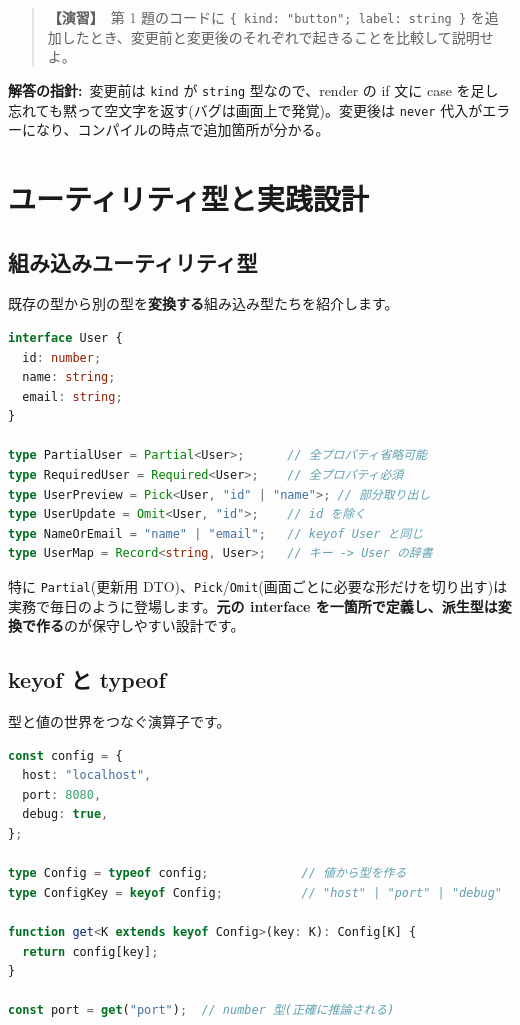 \documentclass{article}
\begin{document}
\begin{quote}
\textbf{【演習】}\ 第 1 題のコードに \texttt{\{ kind: "button"; label: string \}} を追加したとき、変更前と変更後のそれぞれで起きることを比較して説明せよ。
\end{quote}

\textbf{解答の指針:}\ 変更前は \texttt{kind} が \texttt{string} 型なので、render の if 文に case を足し忘れても黙って空文字を返す(バグは画面上で発覚)。変更後は \texttt{never} 代入がエラーになり、コンパイルの時点で追加箇所が分かる。

\section{ユーティリティ型と実践設計}

\subsection{組み込みユーティリティ型}

既存の型から別の型を\textbf{変換する}組み込み型たちを紹介します。

\begin{lstlisting}[language=TypeScript]
interface User {
  id: number;
  name: string;
  email: string;
}

type PartialUser = Partial<User>;      // 全プロパティ省略可能
type RequiredUser = Required<User>;    // 全プロパティ必須
type UserPreview = Pick<User, "id" | "name">; // 部分取り出し
type UserUpdate = Omit<User, "id">;    // id を除く
type NameOrEmail = "name" | "email";   // keyof User と同じ
type UserMap = Record<string, User>;   // キー -> User の辞書
\end{lstlisting}

特に \texttt{Partial}(更新用 DTO)、\texttt{Pick}/\texttt{Omit}(画面ごとに必要な形だけを切り出す)は実務で毎日のように登場します。\textbf{元の interface を一箇所で定義し、派生型は変換で作る}のが保守しやすい設計です。

\subsection{keyof と typeof}

型と値の世界をつなぐ演算子です。

\begin{lstlisting}[language=TypeScript]
const config = {
  host: "localhost",
  port: 8080,
  debug: true,
};

type Config = typeof config;             // 値から型を作る
type ConfigKey = keyof Config;           // "host" | "port" | "debug"

function get<K extends keyof Config>(key: K): Config[K] {
  return config[key];
}

const port = get("port");  // number 型(正確に推論される)
\end{lstlisting}
\end{document}
